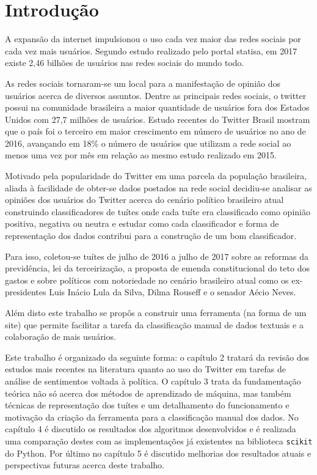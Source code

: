 \chapter{Introdução}

A expansão da internet impulsionou o uso cada vez maior das redes sociais por cada vez mais
usuários. Segundo estudo realizado pelo portal statisa\cite{statisa}, em 2017 existe
2,46 bilhões de usuários nas redes sociais do mundo todo.

As redes sociais tornaram-se um local para a manifestação de opinião dos usuários acerca de
diversos assuntos. Dentre as principais redes sociais, o twitter possui na comunidade brasileira
a maior quantidade de usuários fora dos Estados Unidos com 27,7 milhões de usuários.
Estudo recentes do Twitter Brasil mostram que o país foi o terceiro em maior crescimento em número
de usuários no ano de 2016, avançando em 18\% o número de usuários que utilizam a rede social ao
menos uma vez por mês em relação ao mesmo estudo realizado em 2015.\cite{twitterFolha}

Motivado pela popularidade do Twitter em uma parcela da população brasileira, aliada à facilidade
de obter-se dados postados na rede social decidiu-se analisar as opiniões dos usuários do Twitter
acerca do cenário político brasileiro atual construindo classificadores de tuítes onde cada
tuíte era classificado como opinião positiva, negativa ou neutra e estudar como
cada classificador e forma de representação dos dados contribui para a construção de um bom
classificador. 

Para isso, coletou-se tuítes de julho de 2016 a julho de 2017 sobre as reformas da previdência, lei
da terceirização, a proposta de emenda constitucional do teto dos gastos e sobre políticos
com notoriedade no cenário brasileiro atual como os ex-presidentes Luis Inácio Lula da Silva,
Dilma Rouseff e o senador Aécio Neves.

Além disto este trabalho se propôs a construir uma ferramenta (na forma de um site) que permite
facilitar a tarefa da classificação manual de dados textuais e a colaboração de mais usuários.

Este trabalho é organizado da seguinte forma: o capítulo 2 tratará da revisão dos estudos mais
recentes na literatura quanto ao uso do Twitter em tarefas de análise de sentimentos voltada à
política. O capítulo 3 trata da fundamentação teórica não só acerca dos métodos de aprendizado de
máquina, mas também técnicas de representação dos tuítes e um detalhamento do funcionamento e motivação
da criação da ferramenta para a classificação manual dos dados. No capítulo 4 é discutido os resultados
dos algoritmos desenvolvidos e é realizada uma comparação destes com as implementações já existentes
na biblioteca \texttt{scikit} do Python. Por último no capítulo 5 é discutido melhorias dos resultados
atuais e perspectivas futuras acerca deste trabalho.